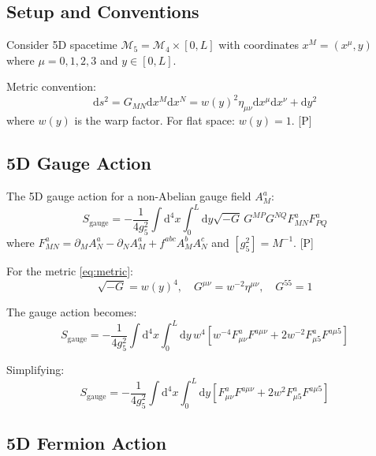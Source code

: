\documentclass[11pt,a4paper]{article}
\newcommand{\dd}{\mathrm{d}}
\begin{document}
\subsection{Setup and Conventions}

Consider 5D spacetime $\mathcal{M}_5 = \mathcal{M}_4 \times [0,L]$ with coordinates
$x^M = (x^\mu, y)$ where $\mu = 0,1,2,3$ and $y \in [0,L]$.

Metric convention:
\begin{equation}
\dd s^2 = G_{MN} \dd x^M \dd x^N = w(y)^2 \eta_{\mu\nu} \dd x^\mu \dd x^\nu + \dd y^2
\label{eq:metric}
\end{equation}
where $w(y)$ is the warp factor. For flat space: $w(y) = 1$. [P]

\subsection{5D Gauge Action}

The 5D gauge action for a non-Abelian gauge field $A_M^a$:
\begin{equation}
S_{\text{gauge}} = -\frac{1}{4g_5^2} \int \dd^4x \int_0^L \dd y \sqrt{-G}\, G^{MP}G^{NQ} F_{MN}^a F_{PQ}^a
\label{eq:gauge-action}
\end{equation}
where $F_{MN}^a = \partial_M A_N^a - \partial_N A_M^a + f^{abc} A_M^b A_N^c$ and
$[g_5^2] = M^{-1}$. [P]

For the metric \eqref{eq:metric}:
\begin{equation}
\sqrt{-G} = w(y)^4, \quad G^{\mu\nu} = w^{-2}\eta^{\mu\nu}, \quad G^{55} = 1
\label{eq:metric-components}
\end{equation}

The gauge action becomes:
\begin{equation}
S_{\text{gauge}} = -\frac{1}{4g_5^2} \int \dd^4x \int_0^L \dd y\, w^4
\left[ w^{-4} F_{\mu\nu}^a F^{a\mu\nu} + 2 w^{-2} F_{\mu 5}^a F^{a\mu 5} \right]
\label{eq:gauge-expanded}
\end{equation}

Simplifying:
\begin{equation}
S_{\text{gauge}} = -\frac{1}{4g_5^2} \int \dd^4x \int_0^L \dd y
\left[ F_{\mu\nu}^a F^{a\mu\nu} + 2 w^2 F_{\mu 5}^a F^{a\mu 5} \right]
\label{eq:gauge-simplified}
\end{equation}

\subsection{5D Fermion Action}
\end{document}
